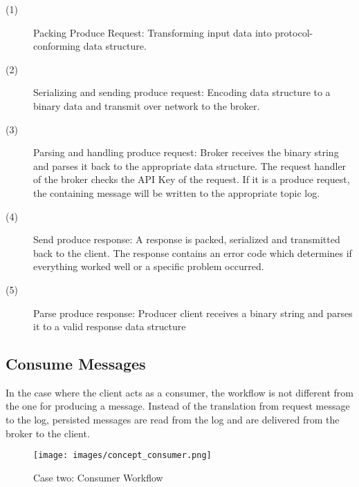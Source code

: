 \begin{description}
    \item [(1)] 
        {Packing Produce Request: Transforming input data into protocol-conforming data structure.}
    \item [(2)] 
        {Serializing and sending produce request: Encoding data structure to a
            binary data and transmit over network to the broker.}
    \item [(3)] 
        {Parsing and handling produce request: Broker receives the binary string
            and parses it back to the appropriate data structure. The request
            handler of the  broker checks the API Key of the request. If it is a
            produce request, the containing message will be written to the
            appropriate topic log.}
    \item [(4)] 
        {Send produce response: A response is packed, serialized and transmitted
            back to the client. The response contains an error code which
            determines if everything worked well or a specific problem occurred.
        }
    \item [(5)] 
        {Parse produce response: Producer client receives a binary string and
            parses it to a valid response data structure }
\end{description}

\newpage
\subsection{Consume Messages}

In the case where the client acts as a consumer, the workflow is not different from the one for
producing a message. Instead of the translation from request message to the log, persisted messages
are read from the log and are delivered from the broker to the client.

\begin{figure}[H]
    \centering
   \texttt{[image: images/concept\_consumer.png]}
    \caption{Case two: Consumer Workflow}
    \label{fig:concept-consumer}
\end{figure}

